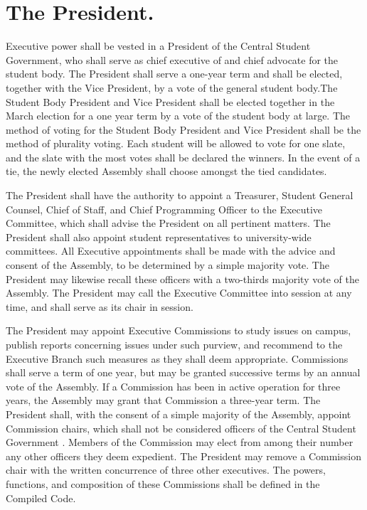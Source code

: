 \section{The President.}
    Executive power shall be vested in a President of the Central Student Government, who shall serve as chief executive of and chief advocate for the student body. The President shall serve a one-year term and shall be elected, together with the Vice President, by a vote of the general student body.The Student Body President and Vice President shall be elected together in the March election for a one year term by a vote of the student body at large.  The method of voting for the Student Body President and Vice President shall be the method of plurality voting.  Each student will be allowed to vote for one slate, and the slate with the most votes shall be declared the winners.  In the event of a tie, the newly elected Assembly shall choose amongst the tied candidates.

    The President shall have the authority to appoint a Treasurer, Student General Counsel, Chief of Staff, and Chief Programming Officer to the Executive Committee, which shall advise the President on all pertinent matters. The President shall also appoint student representatives to university-wide committees. All Executive appointments shall be made with the advice and consent of the Assembly, to be determined by a simple majority vote. The President may likewise recall these officers with a two-thirds majority vote of the Assembly. The President may call the Executive Committee into session at any time, and shall serve as its chair in session.

    The President may appoint Executive Commissions to study issues on campus, publish reports concerning issues under such purview, and recommend to the Executive Branch such measures as they shall deem appropriate. Commissions shall serve a term of one year, but may be granted successive terms by an annual vote of the Assembly. If a Commission has been in active operation for three years, the Assembly may grant that Commission a three-year term. The President shall, with the consent of a simple majority of the Assembly, appoint Commission chairs, which shall not be considered officers of the Central Student Government . Members of the Commission may elect from among their number any other officers they deem expedient. The President may remove a Commission chair with the written concurrence of three other executives. The powers, functions, and composition of these Commissions shall be defined in the Compiled Code.

